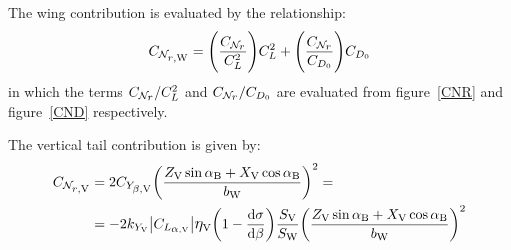 The wing contribution is evaluated by the relationship:
\begin{equation}
\label{eq:yawyawrateW}
\CNrrateW = \Biggl( \frac{\CNrrate}{\CLift^2} \Biggr) \CLift^2 + \Biggl( \frac{\CNrrate}{\CDo} \Biggr) \CDo
\end{equation}
in which the terms ${\CNrrate}/{\CLift^2}$ and ${\CNrrate}/{\CDo}$ are evaluated from figure~\vref{CNR} and figure~\vref{CND} respectively.

The vertical tail contribution is given by:
\begin{equation}
\label{eq:yawyawrateV}
\begin{split}
\CNrrateV & = 2 \CYbetaV \biggl ( \frac{\ZV \sin\alphaB + \XV\cos\alphaB}{\bW} \biggr )^2 = \\
& = -2  k_{Y_\textrm V} \big|\CLalphaV \big| \etaV \biggl( 1 - \frac{\mathrm{d}\sigma}{\mathrm{d}\beta} \biggr) \frac{\SV}{\SW} \biggl ( \frac{\ZV \sin\alphaB + \XV\cos\alphaB}{\bW} \biggr )^2
\end{split}
\end{equation}

